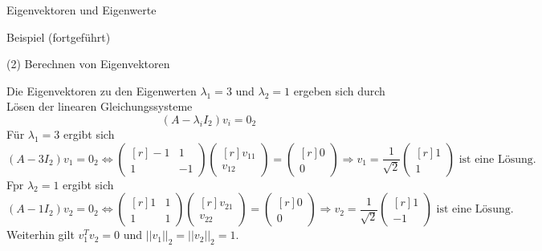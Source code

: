\documentclass[
  8pt,
  ignorenonframetext,
]{beamer}
\begin{document}
\begin{frame}{Eigenvektoren und Eigenwerte}
\protect\hypertarget{eigenvektoren-und-eigenwerte-6}{}

Beispiel (fortgeführt)

\small

\noindent (2) Berechnen von Eigenvektoren

\footnotesize

Die Eigenvektoren zu den Eigenwerten \(\lambda_1 = 3\) und
\(\lambda_2 = 1\) ergeben sich durch Lösen der linearen
Gleichungssysteme \begin{equation}
(A - \lambda_i I_2)v_i = 0_2
\end{equation} Für \(\lambda_1 = 3\) ergibt sich \begin{equation}
(A - 3I_2)v_1 = 0_2
\Leftrightarrow
\begin{pmatrix*}[r]
-1 & 1 \\
 1 & -1
\end{pmatrix*}
\begin{pmatrix*}[r]
v_{11} \\
v_{12}
\end{pmatrix*}
=
\begin{pmatrix*}[r]
0 \\
0
\end{pmatrix*}
\Rightarrow
v_1 =
\frac{1}{\sqrt{2}}
\begin{pmatrix*}[r]
1 \\
1
\end{pmatrix*}
\mbox{ ist eine Lösung. }
\end{equation} Fpr \(\lambda_2 = 1\) ergibt sich \begin{equation}
(A - 1I_2)v_2 = 0_2
\Leftrightarrow
\begin{pmatrix*}[r]
1 & 1 \\
1 & 1
\end{pmatrix*}
\begin{pmatrix*}[r]
v_{21} \\
v_{22}
\end{pmatrix*}
=
\begin{pmatrix*}[r]
0 \\
0
\end{pmatrix*}
\Rightarrow
v_2 =
\frac{1}{\sqrt{2}}
\begin{pmatrix*}[r]
1 \\
-1
\end{pmatrix*}
\mbox{ ist eine Lösung. }
\end{equation} Weiterhin gilt \(v_1^Tv_2 = 0\) und
\(||v_1||_2 = ||v_2||_2 = 1\).
\end{frame}
\end{document}
